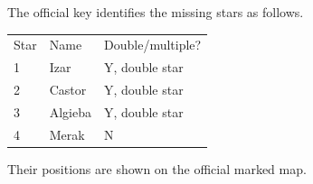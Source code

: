 The official key identifies the missing stars as follows.
\begin{center}
\begin{tabular}{lll}
Star & Name & Double/multiple?\\
1 & Izar & Y, double star\\
2 & Castor & Y, double star\\
3 & Algieba & Y, double star\\
4 & Merak & N\\
\end{tabular}
\end{center}
Their positions are shown on the official marked map.
